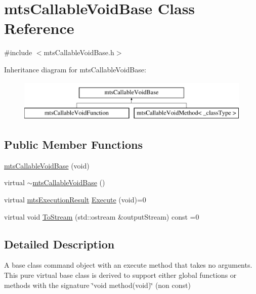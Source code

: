 \hypertarget{classmts_callable_void_base}{}\section{mts\+Callable\+Void\+Base Class Reference}
\label{classmts_callable_void_base}


{\ttfamily \#include $<$mts\+Callable\+Void\+Base.\+h$>$}

Inheritance diagram for mts\+Callable\+Void\+Base\+:\begin{figure}[H]
\begin{center}
\leavevmode
\includegraphics[height=2.000000cm]{d5/dec/classmts_callable_void_base}
\end{center}
\end{figure}
\subsection*{Public Member Functions}
\begin{DoxyCompactItemize}
\item 
\hyperlink{classmts_callable_void_base_a442904860e8544aa4fccd3b9d05fef46}{mts\+Callable\+Void\+Base} (void)
\item 
virtual \hyperlink{classmts_callable_void_base_ae730a7775e63ed730fa0f3fe15202e9c}{$\sim$mts\+Callable\+Void\+Base} ()
\item 
virtual \hyperlink{classmts_execution_result}{mts\+Execution\+Result} \hyperlink{classmts_callable_void_base_a4db041f05ff4a394b88ef53f76ffa86c}{Execute} (void)=0
\item 
virtual void \hyperlink{classmts_callable_void_base_aca49f7ddbc0b2a1d79a78558dc1114b2}{To\+Stream} (std\+::ostream \&output\+Stream) const =0
\end{DoxyCompactItemize}


\subsection{Detailed Description}
A base class command object with an execute method that takes no arguments. This pure virtual base class is derived to support either global functions or methods with the signature \char`\"{}void
method(void)\char`\"{} (non const) 

